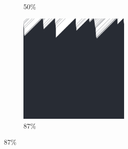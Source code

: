 \documentclass[12pt, fleqn]{report}                             %
\theoremstyle{break}                                            %
\begin{document}
\begin{figure}[ht!]
\begin{subfigure}[b]{0.4\linewidth}
          \caption{50\%}
        \end{subfigure}
        \begin{subfigure}[b]{0.4\linewidth}
          \includegraphics[width=0.6\textwidth]{Images/168/d.png}
          \caption{87\%}
        \end{subfigure}
      \end{figure}
\end{document}
